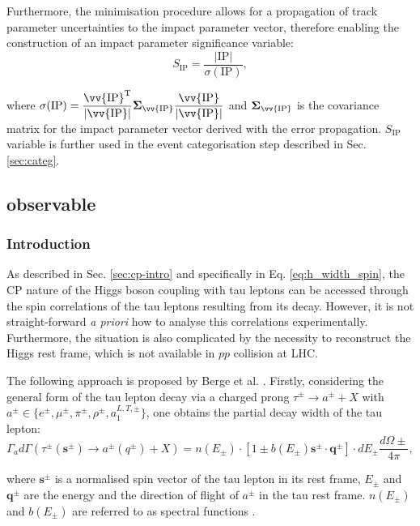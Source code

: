 Furthermore, the minimisation procedure allows for a propagation of track parameter uncertainties to the impact parameter vector, therefore enabling the construction of an impact parameter significance variable:
\begin{equation}
S_{\text{IP}} = \dfrac{|\text{IP}|}{\sigma(\text{IP})},
\end{equation}

where $\sigma(\text{IP}) = \dfrac{\vv{\text{IP}}^{\text{T}}}{|\vv{\text{IP}}|}\boldsymbol{\Sigma}_{\vv{\text{IP}}}\dfrac{\vv{\text{IP}}}{|\vv{\text{IP}}|}$ and $\boldsymbol{\Sigma}_{\vv{\text{IP}}}$ is the covariance matrix for the impact parameter vector derived with the error propagation. $S_{\text{IP}}$ variable is further used in the event categorisation step described in Sec. \ref{sec:categ}.

\subsection{\phicp observable}\label{sec:phicp}
\subsubsection{Introduction}
As described in Sec. \ref{sec:cp-intro} and specifically in Eq. \ref{eq:h_width_spin}, the CP nature of the Higgs boson coupling with tau leptons can be accessed through the spin correlations of the tau leptons resulting from its decay. However, it is not straight-forward \textit{a priori} how to analyse this correlations experimentally. Furthermore, the situation is also complicated by the necessity to reconstruct the Higgs rest frame, which is not available in $pp$ collision at LHC. 

The following approach is proposed by Berge et al. \cite{Berge:2011ij, Berge:2014sra, Berge:2014wta}. Firstly, considering the general form of the tau lepton decay via a charged prong $\tau^\pm \to a^\pm + X$ with $a^\pm \in \{e^\pm, \mu^\pm, \pi^\pm, \rho^\pm, a_1^{L,T,\pm}\}$, one obtains the partial decay width of the tau lepton:
\begin{equation}\label{eq:tau_width}
    \Gamma_ad\Gamma(\tau^\pm(\boldsymbol{s}^\pm) \to a^\pm(q^\pm)+X) = n(E_\pm)\cdot[1 \pm b(E_\pm) \boldsymbol{s}^\pm \cdot \boldsymbol{q}^\pm]\cdot dE_\pm\dfrac{d\Omega\pm}{4\pi},
\end{equation}

where $\boldsymbol{s}^\pm$ is a normalised spin vector of the tau lepton in its rest frame, $E_\pm$ and $\boldsymbol{q}^\pm$ are the energy and the direction of flight of $a^\pm$ in the tau rest frame. $n(E_\pm)$ and $b(E_\pm)$ are referred to as spectral functions \cite{Berge:2011ij}. 


